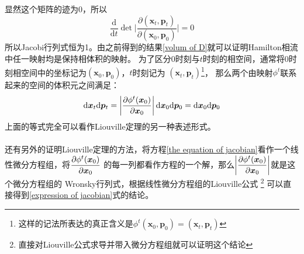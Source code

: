     显然这个矩阵的迹为0，所以
    \begin{equation}
        \frac {\mathrm{d}}{\mathrm{d}t} \det \bigg|\frac {\partial (\bm{x}_t,\bm{p}_t)}{\partial (\bm{x}_0,\bm{p}_0)} \bigg| = 0
    \end{equation}
    所以Jacobi行列式恒为1。由之前得到的结果\ref{volum of D}就可以证明Hamilton相流中任一映射均是保持相体积的映射。
    为了区分0时刻与$t$时刻的相空间，通常将0时刻相空间中的坐标记为$(\bm{x}_0, \bm{p}_0)$，$t$时刻记为
    $(\bm{x}_t,\bm{p}_{t})$\footnote{这样的记法所表达的真正含义是$\phi^t(\bm{x}_0, \bm{p}_0) = (\bm{x}_t, \bm{p}_t)$}，
    那么两个由映射$\phi^t$联系起来的空间的体积元之间满足：
    \begin{equation}
        \mathrm{d}\bm{x}_t \mathrm{d}\bm{p}_t = \left|\frac{\partial{\phi^t(\bm{x}_0)}}{\partial{\bm{x}_0}}\right|\mathrm{d}\bm{x}_0 \mathrm{d}\bm{p}_0 = \mathrm{d} \bm{x}_0\mathrm{d} \bm{p}_0
    \end{equation}
    上面的等式完全可以看作Liouville定理的另一种表述形式。
    \paragraph{}
    还有另外的证明Liouville定理的方法，将方程\ref{the equation of jacobian}看作一个线性微分方程组，将$\displaystyle\frac{\partial{\phi^t(\bm{x}_0)}}{\partial{\bm{x}_0}}$
    的每一列都看作方程的一个解，那么$\displaystyle\left|\frac{\partial{\phi^t(\bm{x}_0)}}{\partial{\bm{x}_0}}\right|$就是这个微分方程组的
    Wronsky行列式，根据线性微分方程组的Liouville公式
    \footnote{直接对Liouville公式求导并带入微分方程组就可以证明这个结论}
    可以直接得到\ref{expression of jacobian}式的结论。
